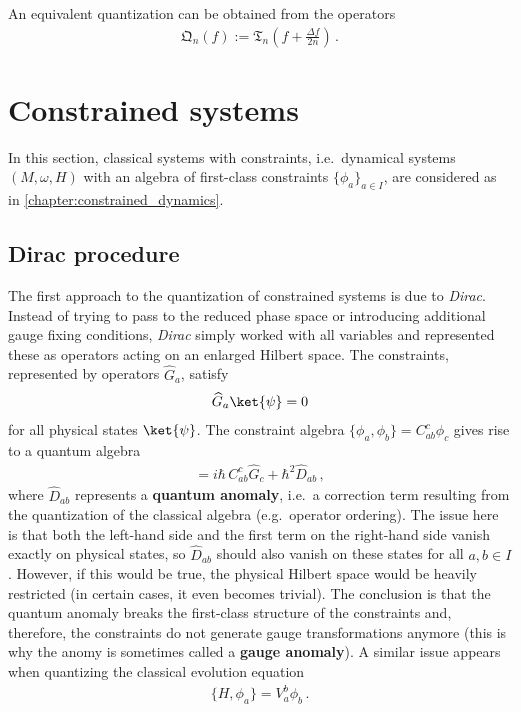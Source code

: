     \begin{remark}
        An equivalent quantization can be obtained from the operators
        \begin{gather}
            \mathfrak{Q}_n(f) := \mathfrak{T}_n\left(f + \frac{\Delta f}{2n}\right)\,.
        \end{gather}
    \end{remark}


\section{Constrained systems}\label{section:quantum_constrained}

    In this section, classical systems with constraints, i.e.~dynamical systems $(M,\omega,H)$ with an algebra of first-class constraints $\{\phi_a\}_{a\in I}$, are considered as in \cref{chapter:constrained_dynamics}.

\subsection{Dirac procedure}

    The first approach to the quantization of constrained systems is due to \textit{Dirac}. Instead of trying to pass to the reduced phase space or introducing additional gauge fixing conditions, \textit{Dirac} simply worked with all variables and represented these as operators acting on an enlarged Hilbert space. The constraints, represented by operators $\widehat{G}_a$, satisfy
    \begin{gather}
        \widehat{G}_a\ket{\psi}=0
    \end{gather}
    for all physical states $\ket{\psi}$. The constraint algebra $\{\phi_a,\phi_b\} = C^c_{ab}\phi_c$ gives rise to a quantum algebra
    \begin{gather}
        [\widehat{G}_a,\widehat{G}_b] = i\hbar\,C^c_{ab}\widehat{G}_c + \hbar^2\widehat{D}_{ab}\,,
    \end{gather}
    where $\widehat{D}_{ab}$ represents a \textbf{quantum anomaly}, i.e.~a correction term resulting from the quantization of the classical algebra (e.g.~operator ordering). The issue here is that both the left-hand side and the first term on the right-hand side vanish exactly on physical states, so $\widehat{D}_{ab}$ should also vanish on these states for all $a,b\in I$. However, if this would be true, the physical Hilbert space would be heavily restricted (in certain cases, it even becomes trivial). The conclusion is that the quantum anomaly breaks the first-class structure of the constraints and, therefore, the constraints do not generate gauge transformations anymore (this is why the anomy is sometimes called a \textbf{gauge anomaly}). A similar issue appears when quantizing the classical evolution equation
    \begin{gather}
        \{H,\phi_a\} = V_a^b\phi_b\,.
    \end{gather}

